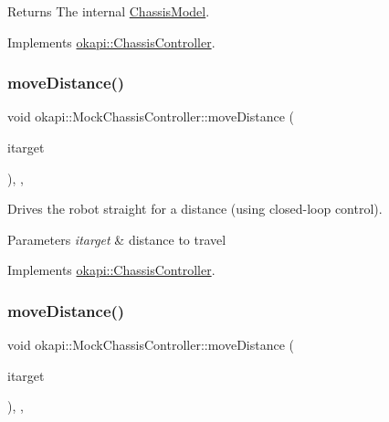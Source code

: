 \begin{DoxyReturn}{Returns}
The internal \mbox{\hyperlink{classokapi_1_1ChassisModel}{Chassis\+Model}}. 
\end{DoxyReturn}


Implements \mbox{\hyperlink{classokapi_1_1ChassisController_a239802eda7e4317a65d1a04994f7b97e}{okapi\+::\+Chassis\+Controller}}.

\mbox{\label{classokapi_1_1MockChassisController_a551b9b8784735664ed02738b80e897e8}} 
\subsubsection{\texorpdfstring{moveDistance()}{moveDistance()}\hspace{0.1cm}{\footnotesize\ttfamily [1/2]}}
{\footnotesize\ttfamily void okapi\+::\+Mock\+Chassis\+Controller\+::move\+Distance (\begin{DoxyParamCaption}\item[{Q\+Length}]{itarget }\end{DoxyParamCaption})\hspace{0.3cm}{\ttfamily [inline]}, {\ttfamily [override]}, {\ttfamily [virtual]}}



Drives the robot straight for a distance (using closed-\/loop control). 


\begin{DoxyParams}{Parameters}
{\em itarget} & distance to travel \\
\hline
\end{DoxyParams}


Implements \mbox{\hyperlink{classokapi_1_1ChassisController_a6d5b69139dfa8b814d05c74c22bcaa43}{okapi\+::\+Chassis\+Controller}}.

\mbox{\label{classokapi_1_1MockChassisController_a69ca536bf75a880b76059cc5187e6172}} 
\subsubsection{\texorpdfstring{moveDistance()}{moveDistance()}\hspace{0.1cm}{\footnotesize\ttfamily [2/2]}}
{\footnotesize\ttfamily void okapi\+::\+Mock\+Chassis\+Controller\+::move\+Distance (\begin{DoxyParamCaption}\item[{double}]{itarget }\end{DoxyParamCaption})\hspace{0.3cm}{\ttfamily [inline]}, {\ttfamily [override]}, {\ttfamily [virtual]}}



